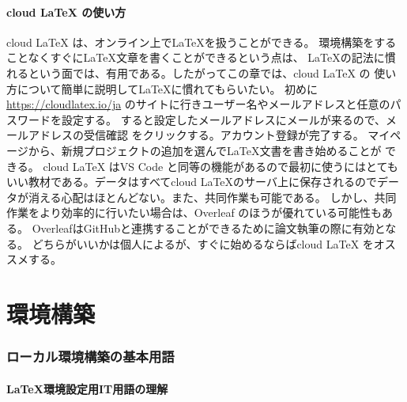 \documentclass[titlepage]{ltjsarticle}
\begin{document}
\subsection{cloud LaTeX の使い方}
cloud LaTeX は、オンライン上で\LaTeX を扱うことができる。
環境構築をすることなくすぐに\LaTeX 文章を書くことができるという点は、
\LaTeX の記法に慣れるという面では、有用である。したがってこの章では、cloud LaTeX の
使い方について簡単に説明して\LaTeX に慣れてもらいたい。
初めに
\url{https://cloudlatex.io/ja}\cite{cloudlatexログインページ}
のサイトに行きユーザー名やメールアドレスと任意のパスワードを設定する。
すると設定したメールアドレスにメールが来るので、メールアドレスの受信確認
をクリックする。アカウント登録が完了する。
マイページから、新規プロジェクトの追加を選んで\LaTeX 文書を書き始めることが
できる。
cloud LaTeX はVS Code と同等の機能があるので最初に使うにはとてもいい教材である。データはすべてcloud LaTeXのサーバ上に保存されるのでデータが消える心配はほとんどない。また、共同作業も可能である。
しかし、共同作業をより効率的に行いたい場合は、Overleaf のほうが優れている可能性もある。
OverleafはGitHubと連携することができるために論文執筆の際に有効となる。
どちらがいいかは個人によるが、すぐに始めるならばcloud LaTeX をオススメする。

\part{環境構築}
\section{ローカル環境構築の基本用語}
\subsection{\LaTeX 環境設定用IT用語の理解}
\end{document}

